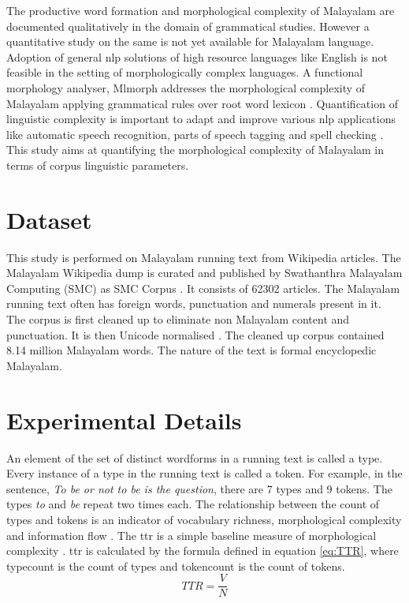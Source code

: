 The productive word formation and morphological complexity of Malayalam are
documented qualitatively in the domain of grammatical studies. However a
quantitative study on the same is not yet available for Malayalam language.
Adoption of general \gls{nlp} solutions of high resource languages like English is
not feasible in the setting of morphologically complex languages. A functional
morphology analyser, Mlmorph addresses the morphological complexity of
Malayalam applying grammatical rules over root word lexicon
\cite{thottingal2019finite}. Quantification of linguistic complexity is
important to adapt and improve various \gls{nlp} applications like automatic speech
recognition, parts of speech tagging and spell checking
\cite{georgiev-etal-2012-feature,kipyatkova2014study,pakoci_using_2019,pirinen2014weighted}. This study aims at quantifying the morphological complexity of Malayalam in
terms of corpus linguistic parameters.

\section{Dataset}

This study is performed on Malayalam running text from Wikipedia articles. The
Malayalam Wikipedia dump is curated and published by Swathanthra Malayalam
Computing (SMC) as SMC Corpus \cite{smctext}. It consists of 62302
articles. The Malayalam running text often has foreign words, punctuation and
numerals present in it. The corpus is first cleaned up to eliminate non
Malayalam content and punctuation. It is then Unicode normalised
\cite{davis2001unicode}. The cleaned up corpus contained 8.14 million Malayalam
words. The nature of the text is formal encyclopedic Malayalam.

\section{Experimental Details}

An element of the set of distinct wordforms in a running text is called a  type. Every instance of a type in the running text is called a  token.
For example, in the sentence, {\em To be or not to be is the question}, there
are 7 types and 9 tokens. The types {\em to} and {\em be} repeat two times
each. The relationship between the count of types and tokens is an indicator of
vocabulary richness, morphological complexity and information flow
\cite{gutierrez2018comparing}. The \gls{ttr} is a simple baseline
measure of morphological complexity \cite{kettunen2014can}. \gls{ttr} is calculated
by the formula defined in equation \ref{eq:TTR}, where \gls{typecount} is the count of types
and \gls{tokencount} is the count of tokens.
\begin{equation}
	TTR = \frac{V}{N}
	\label{eq:TTR}
\end{equation}

